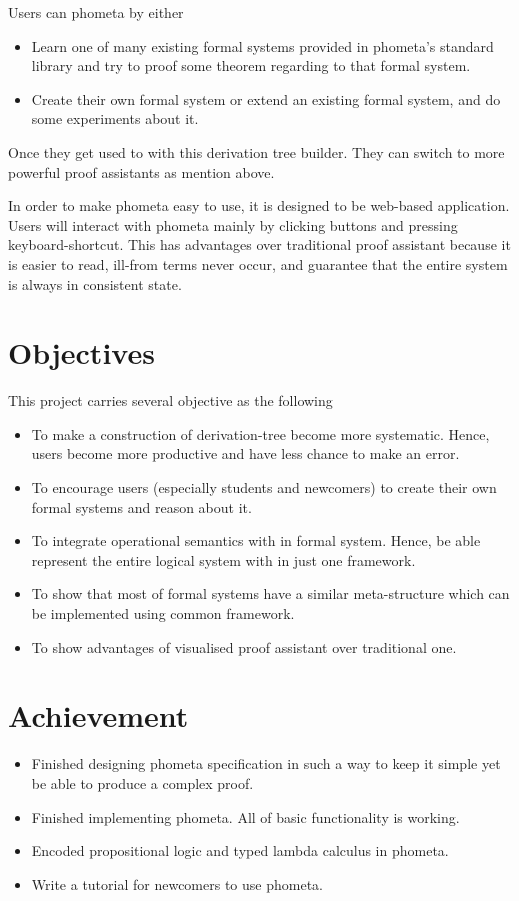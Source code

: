 \documentclass[master.tex]{subfiles}
\begin{document}
\newpage

Users can phometa by either
\begin{itemize}
\item Learn one of many existing formal systems provided in phometa's standard
  library and try to proof some theorem regarding to that formal system.
\item Create their own formal system or extend an existing formal system, and do
  some experiments about it.
\end{itemize}
Once they get used to with this derivation tree builder. They can switch to more
powerful proof assistants as mention above.

In order to make phometa easy to use, it is designed to be web-based
application. Users will interact with phometa mainly by clicking buttons and
pressing keyboard-shortcut. This has advantages over traditional proof assistant
because it is easier to read, ill-from terms never occur, and guarantee that the
entire system is always in consistent state.

\section{Objectives}
This project carries several objective as the following
\begin{itemize}
  \item To make a construction of derivation-tree become more systematic. Hence, users become more productive and have less chance to make an error.
  \item To encourage users (especially students and newcomers) to create their own formal systems and reason about it.
  \item To integrate operational semantics with in formal system. Hence, be able represent the entire logical system with in just one framework.
  \item To show that most of formal systems have a similar meta-structure which can be implemented using common framework.
  \item To show advantages of visualised proof assistant over traditional one.
\end{itemize}

\section{Achievement}
\begin{itemize}
\item Finished designing phometa specification in such a way to keep it simple yet be able
  to produce a complex proof.
\item Finished implementing phometa. All of basic functionality is working.
\item Encoded propositional logic and typed lambda calculus in phometa.
\item Write a tutorial for newcomers to use phometa.
\end{itemize}
\end{document}
